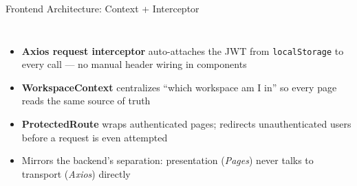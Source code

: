 \documentclass[aspectratio=169, 10pt]{beamer}
\begin{document}
\begin{frame}{Frontend Architecture: Context + Interceptor}
  \begin{columns}[T,onlytextwidth]
      \small
      \begin{itemize}\setlength\itemsep{6pt}
        \item \textbf{Axios request interceptor} auto-attaches the JWT from \texttt{localStorage} to every call --- no manual header wiring in components
        \item \textbf{WorkspaceContext} centralizes ``which workspace am I in'' so every page reads the same source of truth
        \item \textbf{ProtectedRoute} wraps authenticated pages; redirects unauthenticated users before a request is even attempted
        \item Mirrors the backend's separation: presentation (\emph{Pages}) never talks to transport (\emph{Axios}) directly
      \end{itemize}
  \end{columns}
\end{frame}
\end{document}
